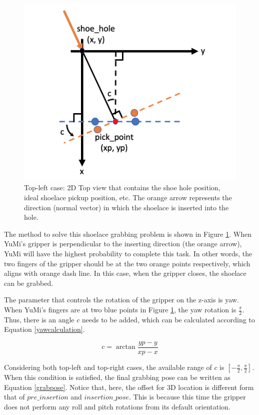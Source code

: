 
\begin{figure}[H]
\centering
\includegraphics[width = 0.5\columnwidth]{Implementation/mp/lacegrab.png}
\caption{Top-left case: 2D Top view that contains the shoe hole position, ideal shoelace pickup position, etc. The orange arrow represents the direction (normal vector) in which the shoelace is inserted into the hole.}
\label{lacegrab}
\end{figure}

The method to solve this shoelace grabbing problem is shown in Figure \ref{lacegrab}. When YuMi's gripper is perpendicular to the inserting direction (the orange arrow), YuMi will have the highest probability to complete this task. In other words, the two fingers of the gripper should be at the two orange points respectively, which aligns with orange dash line. In this case, when the gripper closes, the shoelace can be grabbed. 

The parameter that controls the rotation of the gripper on the z-axis is yaw. When YuMi's fingers are at two blue points in Figure \ref{lacegrab}, the yaw rotation is $\frac{\pi}{2}$. Thus, there is an angle $c$ needs to be added, which can be calculated according to Equation \ref{yawcalculation}.

\begin{equation}
c = \arctan \frac{yp - y}{xp - x}
\label{yawcalculation}
\end{equation}

Considering both top-left and top-right cases, the available range of $c$ is $[-\frac{\pi}{2}, \frac{\pi}{2}]$. When this condition is satisfied, the final grabbing pose can be written as Equation \ref{grabpose}. Notice that, here, the offset for 3D location is different form that of $pre\_insertion$ and $insertion\_pose$. This is because this time the gripper does not perform any roll and pitch rotations from its default orientation.

